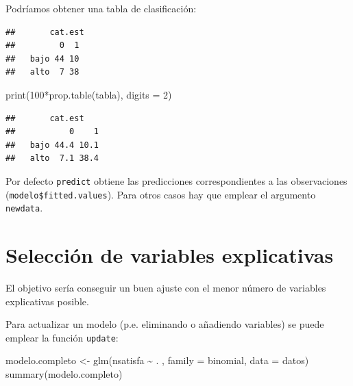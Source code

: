 \documentclass[
]{book}
\newenvironment{Shaded}{\begin{snugshade}}{\end{snugshade}}
\newcommand{\AttributeTok}[1]{\textcolor[rgb]{0.77,0.63,0.00}{#1}}
\newcommand{\DecValTok}[1]{\textcolor[rgb]{0.00,0.00,0.81}{#1}}
\newcommand{\FloatTok}[1]{\textcolor[rgb]{0.00,0.00,0.81}{#1}}
\newcommand{\FunctionTok}[1]{\textcolor[rgb]{0.00,0.00,0.00}{#1}}
\newcommand{\NormalTok}[1]{#1}
\newcommand{\OtherTok}[1]{\textcolor[rgb]{0.56,0.35,0.01}{#1}}
\newcommand{\SpecialCharTok}[1]{\textcolor[rgb]{0.00,0.00,0.00}{#1}}
\theoremstyle{break}
\theoremstyle{nonumberplain}
\begin{document}
Podríamos obtener una tabla de clasificación:

\begin{Shaded}
\end{Shaded}

\begin{verbatim}
##       cat.est
##         0  1
##   bajo 44 10
##   alto  7 38
\end{verbatim}

\begin{Shaded}
\begin{Highlighting}[]
\FunctionTok{print}\NormalTok{(}\DecValTok{100}\SpecialCharTok{*}\FunctionTok{prop.table}\NormalTok{(tabla), }\AttributeTok{digits =} \DecValTok{2}\NormalTok{)}
\end{Highlighting}
\end{Shaded}

\begin{verbatim}
##       cat.est
##           0    1
##   bajo 44.4 10.1
##   alto  7.1 38.4
\end{verbatim}

Por defecto \texttt{predict} obtiene las predicciones correspondientes a las observaciones (\texttt{modelo\$fitted.values}). Para otros casos hay que emplear el argumento \texttt{newdata}.

\hypertarget{selecciuxf3n-de-variables-explicativas-1}{%
\section{Selección de variables explicativas}\label{selecciuxf3n-de-variables-explicativas-1}}

El objetivo sería conseguir un buen ajuste con el menor número de variables explicativas posible.

Para actualizar un modelo (p.e. eliminando o añadiendo variables) se puede emplear la función \texttt{update}:

\begin{Shaded}
\begin{Highlighting}[]
\NormalTok{modelo.completo }\OtherTok{\textless{}{-}} \FunctionTok{glm}\NormalTok{(nsatisfa }\SpecialCharTok{\textasciitilde{}}\NormalTok{ . , }\AttributeTok{family =}\NormalTok{ binomial, }\AttributeTok{data =}\NormalTok{ datos)}
\FunctionTok{summary}\NormalTok{(modelo.completo)}
\end{Highlighting}
\end{Shaded}
\end{document}
